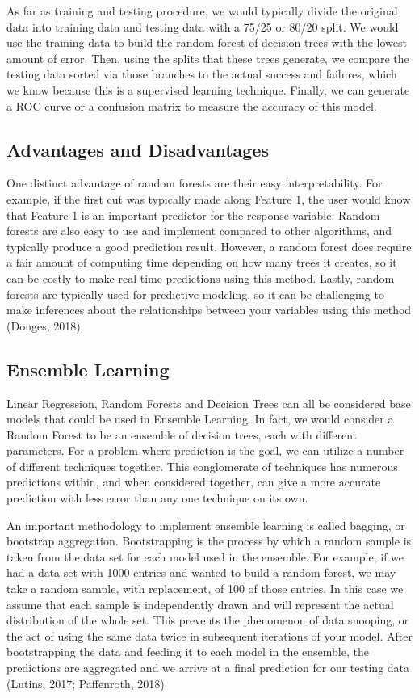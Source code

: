 \tab As far as training and testing procedure, we would typically divide the original data into training data and testing data with a 75/25 or 80/20 split. We would use the training data to build the random forest of decision trees with the lowest amount of error. Then, using the splits that these trees generate, we compare the testing data sorted via those branches to the actual success and failures, which we know because this is a supervised learning technique. Finally, we can generate a ROC curve or a confusion matrix to measure the accuracy of this model.

\subsection{Advantages and Disadvantages}
\tab One distinct advantage of random forests are their easy interpretability. For example, if the first cut was typically made along Feature 1, the user would know that Feature 1 is an important predictor for the response variable. Random forests are also easy to use and implement compared to other algorithms, and typically produce a good prediction result. However, a random forest does require a fair amount of computing time depending on how many trees it creates, so it can be costly to make real time predictions using this method. Lastly, random forests are typically used for predictive modeling, so it can be challenging to make inferences about the relationships between your variables using this method (Donges, 2018).

\subsection{Ensemble Learning}
\tab Linear Regression, Random Forests and Decision Trees can all be considered base models that could be used in Ensemble Learning. In fact, we would consider a Random Forest to be an ensemble of decision trees, each with different parameters. For a problem where prediction is the goal, we can utilize a number of different techniques together. This conglomerate of techniques has numerous predictions within, and when considered together, can give a more accurate prediction with less error than any one technique on its own. \newline

\tab An important methodology to implement ensemble learning is called bagging, or bootstrap aggregation. Bootstrapping is the process by which a random sample is taken from the data set for each model used in the ensemble. For example, if we had a data set with 1000 entries and wanted to build a random forest, we may take a random sample, with replacement, of 100 of those entries. In this case we assume that each sample is independently drawn and will represent the actual distribution of the whole set. This prevents the phenomenon of data snooping, or the act of using the same data twice in subsequent iterations of your model. After bootstrapping the data and feeding it to each model in the ensemble, the predictions are aggregated and we arrive at a final prediction for our testing data (Lutins, 2017; Paffenroth, 2018)
\newline \tab 

